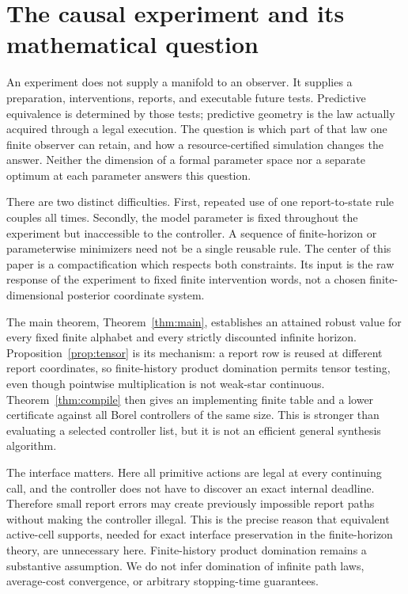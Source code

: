 \section{The causal experiment and its mathematical question}\label{sec:context}
An experiment does not supply a manifold to an observer. It supplies a preparation, interventions, reports, and executable future tests. Predictive equivalence is determined by those tests; predictive geometry is the law actually acquired through a legal execution. The question is which part of that law one finite observer can retain, and how a resource-certified simulation changes the answer. Neither the dimension of a formal parameter space nor a separate optimum at each parameter answers this question.

There are two distinct difficulties. First, repeated use of one report-to-state rule couples all times. Secondly, the model parameter is fixed throughout the experiment but inaccessible to the controller. A sequence of finite-horizon or parameterwise minimizers need not be a single reusable rule. The center of this paper is a compactification which respects both constraints. Its input is the raw response of the experiment to fixed finite intervention words, not a chosen finite-dimensional posterior coordinate system.

The main theorem, Theorem~\ref{thm:main}, establishes an attained robust value for every fixed finite alphabet and every strictly discounted infinite horizon. Proposition~\ref{prop:tensor} is its mechanism: a report row is reused at different report coordinates, so finite-history product domination permits tensor testing, even though pointwise multiplication is not weak-star continuous. Theorem~\ref{thm:compile} then gives an implementing finite table and a lower certificate against all Borel controllers of the same size. This is stronger than evaluating a selected controller list, but it is not an efficient general synthesis algorithm.

The interface matters. Here all primitive actions are legal at every continuing call, and the controller does not have to discover an exact internal deadline. Therefore small report errors may create previously impossible report paths without making the controller illegal. This is the precise reason that equivalent active-cell supports, needed for exact interface preservation in the finite-horizon theory, are unnecessary here. Finite-history product domination remains a substantive assumption. We do not infer domination of infinite path laws, average-cost convergence, or arbitrary stopping-time guarantees.

